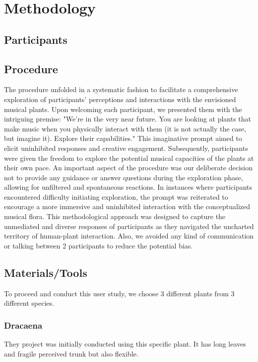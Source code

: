 
\section{Methodology}

\subsection{Participants}




\subsection{Procedure}

The procedure unfolded in a systematic fashion to facilitate a comprehensive exploration of participants' perceptions and interactions with the envisioned musical plants. Upon welcoming each participant, we presented them with the intriguing premise: "We're in the very near future. You are looking at plants that make music when you physically interact with them (it is not actually the case, but imagine it). Explore their capabilities." This imaginative prompt aimed to elicit uninhibited responses and creative engagement. Subsequently, participants were given the freedom to explore the potential musical capacities of the plants at their own pace. An important aspect of the procedure was our deliberate decision not to provide any guidance or answer questions during the exploration phase, allowing for unfiltered and spontaneous reactions. In instances where participants encountered difficulty initiating exploration, the prompt was reiterated to encourage a more immersive and uninhibited interaction with the conceptualized musical flora. This methodological approach was designed to capture the unmediated and diverse responses of participants as they navigated the uncharted territory of human-plant interaction. Also, we avoided any kind of communication or talking between 2 participants to reduce the potential bias.


\subsection{Materials/Tools}

To proceed and conduct this user study, we choose 3 different plants from 3 different species.

\newpage

\subsubsection{Dracaena}
They project was initially conducted using this specific plant. It has long leaves and fragile perceived trunk but also flexible.

